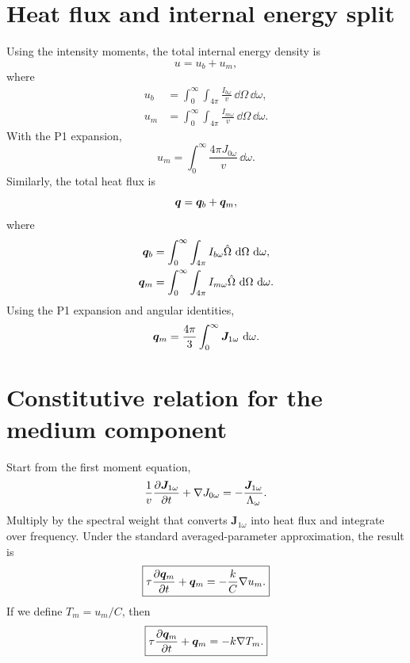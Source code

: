 \documentclass[11pt]{article}
\begin{document}
\section{Heat flux and internal energy split}
Using the intensity moments, the total internal energy density is
\begin{equation}
    u=u_b+u_m,
    \label{eq:u_split}
\end{equation}
where
\begin{align}
    u_b &=\int_0^\infty\int_{4\pi}\frac{I_{b\omega}}{v}\,\dd\Omega\,\dd\omega,\\
    u_m &=\int_0^\infty\int_{4\pi}\frac{I_{m\omega}}{v}\,\dd\Omega\,\dd\omega.
\end{align}
With the P1 expansion,
\begin{equation}
    u_m=\int_0^\infty \frac{4\pi J_{0\omega}}{v}\,\dd\omega.
\end{equation}
Similarly, the total heat flux is
\begin{equation}
    \bm{q}=\bm{q}_b+\bm{q}_m,
    \label{eq:q_split}
\end{equation}
where
\begin{align}
    \bm{q}_b &=\int_0^\infty\int_{4\pi} I_{b\omega}\hat{\Omega}\,\mathop{}\!\mathrm{d}\Omega\,\mathop{}\!\mathrm{d}\omega,\\
    \bm{q}_m &=\int_0^\infty\int_{4\pi} I_{m\omega}\hat{\Omega}\,\mathop{}\!\mathrm{d}\Omega\,\mathop{}\!\mathrm{d}\omega.
\end{align}
Using the P1 expansion and angular identities,
\begin{equation}
    \bm{q}_m=\frac{4\pi}{3}\int_0^\infty \bm{J}_{1\omega}\,\mathop{}\!\mathrm{d}\omega.
    \label{eq:qm_j1}
\end{equation}

\section{Constitutive relation for the medium component}
Start from the first moment equation,
\begin{equation}
    \frac{1}{v}\frac{\partial \bm{J}_{1\omega}}{\partial t}+\nabla J_{0\omega}
    =-\frac{\bm{J}_{1\omega}}{\Lambda_\omega}.
\end{equation}
Multiply by the spectral weight that converts \(\bm{J}_{1\omega}\) into heat flux and integrate over frequency. Under the standard averaged-parameter approximation, the result is
\begin{equation}
    \boxed{\tau\frac{\partial \bm{q}_m}{\partial t}+\bm{q}_m
    =-\frac{k}{C}\nabla u_m.}
    \label{eq:qm_constitutive_um}
\end{equation}
If we define \(T_m=u_m/C\), then
\begin{equation}
    \boxed{\tau\frac{\partial \bm{q}_m}{\partial t}+\bm{q}_m=-k\nabla T_m.}
    \label{eq:qm_constitutive_Tm}
\end{equation}
\end{document}
